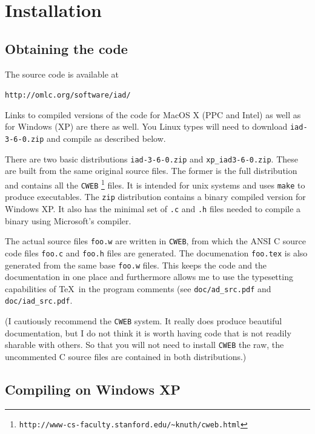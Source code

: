 \documentclass{article}
\begin{document}
\clearpage
\section{Installation}

\subsection{Obtaining the code}

The source code is available at
\begin{center}
\texttt{http://omlc.org/software/iad/}
\end{center}
Links to compiled versions of the code for MacOS X (PPC and Intel) as well as
for Windows (XP) are there as well.  You Linux types will need to download 
\texttt{iad-3-6-0.zip} and compile as described below.

There are two basic distributions \texttt{iad-3-6-0.zip} and \texttt{xp\_iad3-6-0.zip}.
These are built from the same original source files.  
The former is the full distribution and contains all the \texttt{CWEB}%
\footnote{\texttt{http://www-cs-faculty.stanford.edu/\~{}knuth/cweb.html}}
files.  It is intended for unix systems and uses \texttt{make} to produce
executables.  The \texttt{zip} distribution contains a binary compiled version
for Windows XP.  It also has the minimal set of \texttt{.c} and \texttt{.h} 
files needed to compile a binary using Microsoft's compiler.

The actual source files \texttt{foo.w} are  written in \texttt{CWEB}, from which the
ANSI C source code files \texttt{foo.c} and \texttt{foo.h} files are 
generated.  The documenation \texttt{foo.tex} is also generated from the same
base \texttt{foo.w} files.  This keeps the code and the documentation in one
place and furthermore allows me to use the typesetting  capabilities of \TeX\ in
the program comments (see \texttt{doc/ad\_src.pdf} and \texttt{doc/iad\_src.pdf}.

(I cautiously recommend the \texttt{CWEB} system.  It
really does produce beautiful documentation, but I do not think it is worth
having code that is not readily sharable with others.
So that you will not need to install \texttt{CWEB} the raw, the
uncommented C source files are contained in both distributions.)

\subsection{Compiling on Windows XP}
\end{document}
